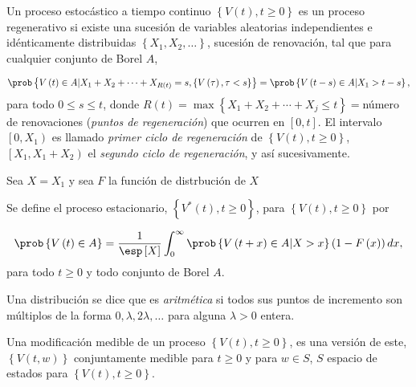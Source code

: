 Un proceso estoc\'astico a tiempo continuo $\left\{V\left(t\right),t\geq0\right\}$ es un proceso regenerativo si existe una sucesi\'on de variables aleatorias independientes e id\'enticamente distribuidas $\left\{X_{1},X_{2},\ldots\right\}$, sucesi\'on de renovaci\'on, tal que para cualquier conjunto de Borel $A$, 

\begin{eqnarray*}
\prob\left\{V\left(t\right)\in A|X_{1}+X_{2}+\cdots+X_{R\left(t\right)}=s,\left\{V\left(\tau\right),\tau<s\right\}\right\}=\prob\left\{V\left(t-s\right)\in A|X_{1}>t-s\right\},
\end{eqnarray*}
para todo $0\leq s\leq t$, donde $R\left(t\right)=\max\left\{X_{1}+X_{2}+\cdots+X_{j}\leq t\right\}=$n\'umero de renovaciones ({\emph{puntos de regeneraci\'on}}) que ocurren en $\left[0,t\right]$. El intervalo $\left[0,X_{1}\right)$ es llamado {\emph{primer ciclo de regeneraci\'on}} de $\left\{V\left(t \right),t\geq0\right\}$, $\left[X_{1},X_{1}+X_{2}\right)$ el {\emph{segundo ciclo de regeneraci\'on}}, y as\'i sucesivamente.

Sea $X=X_{1}$ y sea $F$ la funci\'on de distrbuci\'on de $X$


\begin{Def}
Se define el proceso estacionario, $\left\{V^{*}\left(t\right),t\geq0\right\}$, para $\left\{V\left(t\right),t\geq0\right\}$ por

\begin{eqnarray*}
\prob\left\{V\left(t\right)\in A\right\}=\frac{1}{\esp\left[X\right]}\int_{0}^{\infty}\prob\left\{V\left(t+x\right)\in A|X>x\right\}\left(1-F\left(x\right)\right)dx,
\end{eqnarray*} 
para todo $t\geq0$ y todo conjunto de Borel $A$.
\end{Def}

\begin{Def}
Una distribuci\'on se dice que es {\emph{aritm\'etica}} si todos sus puntos de incremento son m\'ultiplos de la forma $0,\lambda, 2\lambda,\ldots$ para alguna $\lambda>0$ entera.
\end{Def}


\begin{Def}
Una modificaci\'on medible de un proceso $\left\{V\left(t\right),t\geq0\right\}$, es una versi\'on de este, $\left\{V\left(t,w\right)\right\}$ conjuntamente medible para $t\geq0$ y para $w\in S$, $S$ espacio de estados para $\left\{V\left(t\right),t\geq0\right\}$.
\end{Def}

